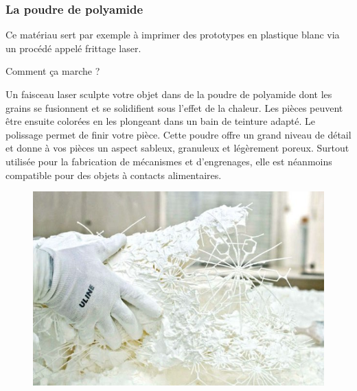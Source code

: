 \documentclass{article}
\begin{document}
\subsubsection{La poudre de polyamide}
Ce matériau sert par exemple à imprimer des prototypes en plastique blanc via un procédé appelé frittage laser.\hfill
 \par\leavevmode\par
Comment ça marche ?\hfill
 \par\leavevmode\par
Un faisceau laser sculpte votre objet dans de la poudre de polyamide dont les grains se fusionnent et se solidifient sous l'effet de la chaleur. Les pièces peuvent être ensuite colorées en les plongeant dans un bain de teinture adapté. Le polissage permet de finir votre pièce. Cette poudre offre un grand niveau de détail et donne à vos pièces un aspect sableux, granuleux et légèrement poreux. Surtout utilisée pour la fabrication de mécanismes et d'engrenages, elle est néanmoins compatible pour des objets à contacts alimentaires.\hfill
 \par\leavevmode\par
{}

\begin{figure}[h!]
\centering
\includegraphics[scale=0.4]{./images/poudre-plastique.png}
\end{figure}\hfill
\newpage
\end{document}
